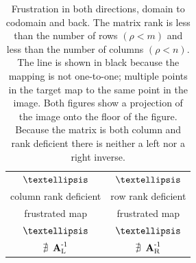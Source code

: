 \begin{table}[htdp]
\begin{center}
\begin{tabular}{cc}
 $\textellipsis$ & $\textellipsis$ \\
column rank deficient & row rank deficient\\
frustrated map & frustrated map\\
 $\textellipsis$ & $\textellipsis$ \\
 $\nexists\ \AinvL$ &  $\nexists\ \AinvR$ \\[10pt]
\end{tabular}
\end{center}
\label{tab:interpII:c}
\caption{Frustration in both directions, domain to codomain and back. The matrix rank is less than the number of rows $(\rho<m)$ and less than the number of columns $(\rho<n)$. The line is shown in black because the mapping is not one-to-one; multiple points in the target map to the same point in the image. Both figures show a projection of the image onto the floor of the figure. Because the matrix is both column and rank deficient there is neither a left nor a right inverse.}
\end{table}

\endinput
